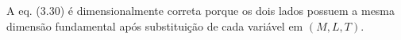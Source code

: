 A eq. (3.30) é dimensionalmente correta porque os dois lados possuem a mesma dimensão fundamental após substituição de cada variável em $(M,L,T)$.


